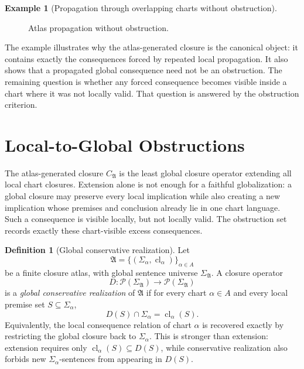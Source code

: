 \documentclass[11pt]{amsart}
\numberwithin{equation}{section}
\theoremstyle{plain}
\theoremstyle{definition}
\newtheorem{definition}[theorem]{Definition}
\newtheorem{example}[theorem]{Example}
\theoremstyle{remark}
\newcommand{\Pow}{\mathcal P}
\newcommand{\Cl}{\operatorname{cl}}
\newcommand{\A}{\mathfrak A}
\newcommand{\Sig}{\Sigma}
\newcommand{\CA}{C_{\mathfrak A}}
\begin{document}
\begin{example}[Propagation through overlapping charts without obstruction]
\begin{figure}[!htbp]
\caption{Atlas propagation without obstruction.}
\label{fig:atlas-propagation-no-obstruction}
\end{figure}

\end{example}

The example illustrates why the atlas-generated closure is the canonical object: it contains exactly the consequences forced by repeated local propagation.  It also shows that a propagated global consequence need not be an obstruction.  The remaining question is whether any forced consequence becomes visible inside a chart where it was not locally valid.  That question is answered by the obstruction criterion.

\section{Local-to-Global Obstructions}
\label{sec:obstructions}

The atlas-generated closure \(\CA\) is the least global closure operator extending all local chart closures.  Extension alone is not enough for a faithful globalization: a global closure may preserve every local implication while also creating a new implication whose premises and conclusion already lie in one chart language.  Such a consequence is visible locally, but not locally valid.  The obstruction set records exactly these chart-visible excess consequences.

\begin{definition}[Global conservative realization]
Let
\[
  \A=\{(\Sig_\alpha,\Cl_\alpha)\}_{\alpha\in A}
\]
be a finite closure atlas, with global sentence universe \(\Sig_{\A}\).  A closure operator
\[
  D:\Pow(\Sig_{\A})\to\Pow(\Sig_{\A})
\]
is a \emph{global conservative realization} of \(\A\) if for every chart \(\alpha\in A\) and every local premise set \(S\subseteq\Sig_\alpha\),
\[
  D(S)\cap\Sig_\alpha=\Cl_\alpha(S).
\]
Equivalently, the local consequence relation of chart \(\alpha\) is recovered exactly by restricting the global closure back to \(\Sig_\alpha\).  This is stronger than extension: extension requires only \(\Cl_\alpha(S)\subseteq D(S)\), while conservative realization also forbids new \(\Sig_\alpha\)-sentences from appearing in \(D(S)\).
\end{definition}
\end{document}
